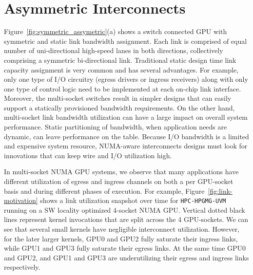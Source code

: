 \vspace{-.1in}
\section{Asymmetric Interconnects}
\label{sec:interconnect}

Figure~\ref{fig:symmetric_assymetric}(a) shows a switch connected GPU
with symmetric and static link bandwidth assignment.
Each link is comprised of equal number of uni-directional high-speed
lanes in both directions, collectively comprising a symmetric bi-directional
link. Traditional static design time link capacity assignment is very common and has
several advantages. For example, only one type of I/O circuitry
(egress drivers or ingress receivers) along with only one type of control logic
need to be implemented at each on-chip link interface. Moreover, the multi-socket
switches result in simpler designs that can easily support a statically provisioned
bandwidth requirements. On the other hand, multi-socket link bandwidth utilization can have
a large impact on overall system performance. Static partitioning of bandwidth,
when application needs are dynamic, can leave performance on the table.
Because I/O bandwidth is a limited and expensive system resource, NUMA-aware
interconnects designs must look for innovations that can keep wire and I/O
utilization high. 

In multi-socket NUMA GPU systems, we observe that many applications have 
different utilization of egress and ingress channels on both a per GPU-socket basis
and during different phases of execution. For example,
Figure~\ref{fig:link-motivation} shows a link utilization snapshot over time for
\texttt{HPC-HPGMG-UVM} running on a SW locality optimized 4-socket NUMA GPU. 
Vertical dotted black lines represent
kernel invocations that are split across the 4 GPU-sockets. We can see that 
several small kernels have
negligible interconnect utilization. However, for the later
larger kernels, GPU0 and GPU2 fully saturate their ingress links,
while GPU1 and GPU3 fully saturate their egress links. At the same time GPU0 
and GPU2, and GPU1 and GPU3 are underutilizing their egress and ingress links respectively.

